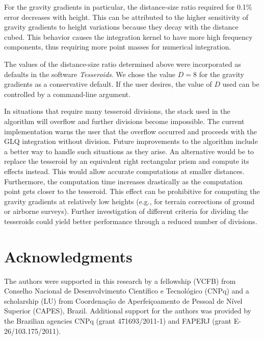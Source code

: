 \documentclass[paper,twocolumn,twoside]{geophysics}
\begin{document}
For the gravity gradients in particular,
the distance-size ratio required for 0.1\% error decreases with height.
This can be attributed to the higher sensitivity of gravity gradients
to height variations because they decay with the distance cubed.
This behavior causes the integration kernel to have more high frequency
components, thus requiring more point masses for numerical integration.


The values of the distance-size ratio determined above were
incorporated as defaults in the software \emph{Tesseroids}.
We chose the value $D=8$ for the gravity gradients as a conservative default.
If the user desires, the value of $D$ used can be controlled by a command-line
argument.


In situations that require many tesseroid divisions,
the stack used in the algorithm will overflow and further
divisions become impossible.
The current implementation warns the user that
the overflow occurred and proceeds with the GLQ integration without division.
Future improvements to the algorithm include a better way to handle such
situations as they arise.
An alternative would be to replace the tesseroid by an equivalent
right rectangular prism and compute its effects instead.
This would allow accurate computations at smaller distances.
Furthermore,
the computation time increases drastically as the computation point
gets closer to the tesseroid.
This effect can be prohibitive for computing the gravity gradients at
relatively low heights (e.g., for terrain corrections of
ground or airborne surveys).
Further investigation of different criteria for dividing the tesseroids could
yield better performance through a reduced number of divisions.


\section{Acknowledgments}

The authors were supported in this research by
a fellowship (VCFB) from
Conselho Nacional de Desenvolvimento Cient\'ifico e Tecnol\'ogico (CNPq)
and a scholarship (LU) from
Coordena\c{c}\~ao de Aperfei\c{c}oamento de Pessoal de N\'ivel Superior
(CAPES),
Brazil.
Additional support for the authors was provided by
the Brazilian agencies CNPq (grant 471693/2011-1) and
FAPERJ (grant E-26/103.175/2011).



\end{document}
